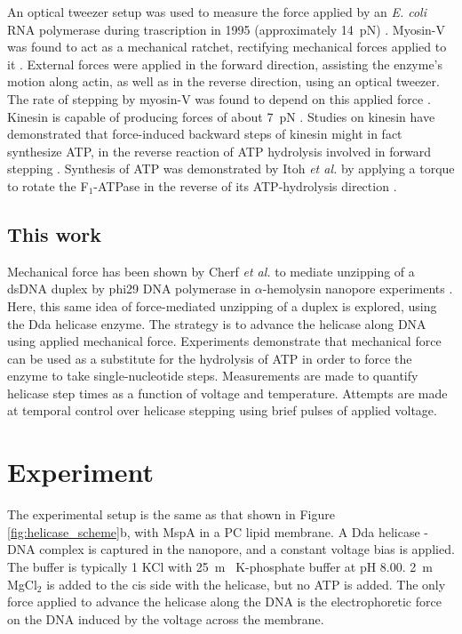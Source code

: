 An optical tweezer setup was used to measure the force applied by an \textit{E. coli} RNA polymerase during trascription in 1995 (approximately \SI{14}{\pico\N}) \citep{Yin1995}.  Myosin-V was found to act as a mechanical ratchet, rectifying mechanical forces applied to it \citep{Gebhardt2006}.  External forces were applied in the forward direction, assisting the enzyme's motion along actin, as well as in the reverse direction, using an optical tweezer.  The rate of stepping by myosin-V was found to depend on this applied force \citep{Clemen2005}.  Kinesin is capable of producing forces of about \SI{7}{\pico\N} \citep{Higuchi1997}.  Studies on kinesin have demonstrated that force-induced backward steps of kinesin might in fact synthesize ATP, in the reverse reaction of ATP hydrolysis involved in forward stepping \citep{Hyeon2009}.  Synthesis of ATP was demonstrated by Itoh \textit{et al.} by applying a torque to rotate the F$_1$-ATPase in the reverse of its ATP-hydrolysis direction \citep{Itoh2004}.

\subsection{This work}

Mechanical force has been shown by Cherf \textit{et al.} to mediate unzipping of a dsDNA duplex by phi29 DNA polymerase in $\alpha$-hemolysin nanopore experiments \citep{Cherf2012}.  Here, this same idea of force-mediated unzipping of a duplex is explored, using the Dda helicase enzyme.  The strategy is to advance the helicase along DNA using applied mechanical force.  Experiments demonstrate that mechanical force can be used as a substitute for the hydrolysis of ATP in order to force the enzyme to take single-nucleotide steps.  Measurements are made to quantify helicase step times as a function of voltage and temperature.  Attempts are made at temporal control over helicase stepping using brief pulses of applied voltage.


\section{Experiment}

The experimental setup is the same as that shown in Figure \ref{fig:helicase_scheme}b, with MspA in a PC lipid membrane.  A Dda helicase - DNA complex is captured in the nanopore, and a constant voltage bias is applied.  The buffer is typically \SI{1}{\Molar} KCl with \SI{25}{\m\Molar} K-phosphate buffer at pH \num{8.00}.  \SI{2}{\m\Molar} MgCl$_2$ is added to the cis side with the helicase, but no ATP is added.  The only force applied to advance the helicase along the DNA is the electrophoretic force on the DNA induced by the voltage across the membrane.

